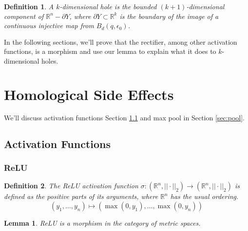 \documentclass{article}
\newtheorem{definition}{Definition}
\newtheorem{lemma}{Lemma}
\newcommand{\R}{\mathbb{R}}
\begin{document}
\begin{definition}
A \emph{$k$-dimensional hole} is the bounded $(k+1)$-dimensional component of $\R^n-\partial Y$, where $\partial Y\subset \R^{k}$ is the boundary of the image of a continuous injective map from $ B_d(q,\epsilon_0)$.
\end{definition}

In the following sections, we'll prove that the rectifier, among other activation functions, is a morphism and use our lemma to explain what it does to $k$-dimensional holes.

\section{Homological Side Effects}\label{sec:holes}
We'll discuss activation functions Section \ref{sec:act} and max pool in Section \ref{sec:pool}.

\subsection{Activation Functions}\label{sec:act}
\subsubsection{ReLU}
\begin{definition}
The \emph{ReLU activation function} $\sigma:(\R^n,||\cdot||_2)\to(\R^n,||\cdot||_2)$ is defined as the positive parts of its arguments, where $\R^n$ has the usual ordering.
\[
(y_1,\dots,y_n)\mapsto (\max(0, y_1), \dots, \max(0,y_n))
\]
\end{definition}

\begin{lemma}\label{lem:relu}
ReLU is a morphism in the category of metric spaces.
\end{lemma}
\end{document}
